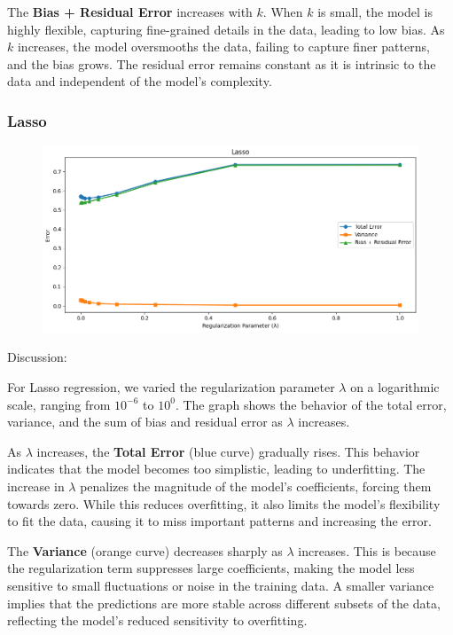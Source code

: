 \documentclass[a4paper,10pt]{article}
\begin{document}
The \textbf{Bias + Residual Error} increases with \(k\). When \(k\) is small, the model is highly flexible, capturing fine-grained details in the data, leading to low bias. As \(k\) increases, the model oversmooths the data, failing to capture finer patterns, and the bias grows. The residual error remains constant as it is intrinsic to the data and independent of the model's complexity.


\subsubsection{Lasso}

\begin{figure}[H]
    \centering
    \includegraphics[width=0.8\linewidth]{2.3_lasso.png}
\end{figure}

Discussion:

For Lasso regression, we varied the regularization parameter \(\lambda\) on a logarithmic scale, ranging from \(10^{-6}\) to \(10^0\). The graph shows the behavior of the total error, variance, and the sum of bias and residual error as \(\lambda\) increases.

As \(\lambda\) increases, the \textbf{Total Error} (blue curve) gradually rises. This behavior indicates that the model becomes too simplistic, leading to underfitting. The increase in \(\lambda\) penalizes the magnitude of the model’s coefficients, forcing them towards zero. While this reduces overfitting, it also limits the model’s flexibility to fit the data, causing it to miss important patterns and increasing the error.

The \textbf{Variance} (orange curve) decreases sharply as \(\lambda\) increases. This is because the regularization term suppresses large coefficients, making the model less sensitive to small fluctuations or noise in the training data. A smaller variance implies that the predictions are more stable across different subsets of the data, reflecting the model's reduced sensitivity to overfitting.
\end{document}
